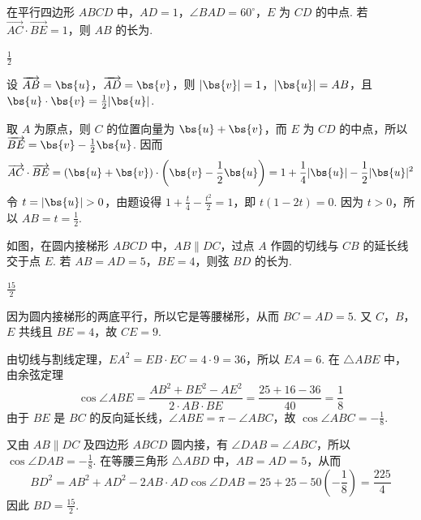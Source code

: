 \begin{problem}
在平行四边形 \(ABCD\) 中，\(AD = 1\)，\(\angle BAD = 60^{\circ}\)，\(E\) 为 \(CD\) 的中点. 若 \(\overrightarrow{AC} \cdot \overrightarrow{BE} = 1\)，则 \(AB\) 的长为\fillinblank{}.
\end{problem}

\begin{answer}
\(\frac{1}{2}\)
\end{answer}

\begin{solution}
设 \(\overrightarrow{AB}=\bs{u}\)，\(\overrightarrow{AD}=\bs{v}\)，则
\(|\bs{v}|=1\)，\(|\bs{u}|=AB\)，且 \(\bs{u}\cdot\bs{v}=\frac{1}{2}|\bs{u}|\).

取 \(A\) 为原点，则 \(C\) 的位置向量为 \(\bs{u}+\bs{v}\)，而 \(E\) 为 \(CD\) 的中点，所以
\(\overrightarrow{BE}=\bs{v}-\frac{1}{2}\bs{u}\). 因而
\[
\overrightarrow{AC}\cdot\overrightarrow{BE}
=(\bs{u}+\bs{v})\cdot\left(\bs{v}-\frac{1}{2}\bs{u}\right)
=1+\frac{1}{4}|\bs{u}|-\frac{1}{2}|\bs{u}|^2
\]
令 \(t=|\bs{u}|>0\)，由题设得
\(1+\frac{t}{4}-\frac{t^2}{2}=1\)，即 \(t(1-2t)=0\). 因为 \(t>0\)，所以 \(AB=t=\frac{1}{2}\).
\end{solution}

\begin{problem}
如图，在圆内接梯形 \(ABCD\) 中，\(AB \parallel DC\)，过点 \(A\) 作圆的切线与 \(CB\) 的延长线交于点 \(E\). 若 \(AB = AD = 5\)，\(BE = 4\)，则弦 \(BD\) 的长为\fillinblank{}.

\end{problem}

\begin{answer}
\(\frac{15}{2}\)
\end{answer}

\begin{solution}
因为圆内接梯形的两底平行，所以它是等腰梯形，从而 \(BC=AD=5\). 又 \(C\)，\(B\)，\(E\) 共线且 \(BE=4\)，故 \(CE=9\).

由切线与割线定理，\(EA^2=EB\cdot EC=4\cdot 9=36\)，所以 \(EA=6\). 在 \(\triangle ABE\) 中，由余弦定理
\[
\cos\angle ABE=\frac{AB^2+BE^2-AE^2}{2\cdot AB\cdot BE}=\frac{25+16-36}{40}=\frac{1}{8}
\]
由于 \(BE\) 是 \(BC\) 的反向延长线，\(\angle ABE=\pi-\angle ABC\)，故 \(\cos\angle ABC=-\frac{1}{8}\).

又由 \(AB\parallel DC\) 及四边形 \(ABCD\) 圆内接，有 \(\angle DAB=\angle ABC\)，所以 \(\cos\angle DAB=-\frac{1}{8}\). 在等腰三角形 \(\triangle ABD\) 中，\(AB=AD=5\)，从而
\[
BD^2=AB^2+AD^2-2AB\cdot AD\cos\angle DAB
=25+25-50\left(-\frac{1}{8}\right)=\frac{225}{4}
\]
因此 \(BD=\frac{15}{2}\).
\end{solution}

